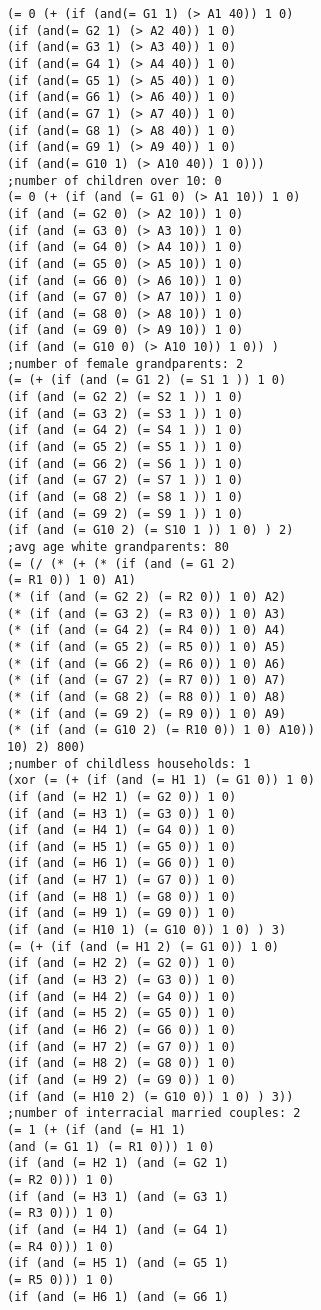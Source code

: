 \documentclass[5p,times,11pt]{elsarticle}
\begin{document}
\begin{verbatim}
(= 0 (+ (if (and(= G1 1) (> A1 40)) 1 0)
(if (and(= G2 1) (> A2 40)) 1 0)
(if (and(= G3 1) (> A3 40)) 1 0)
(if (and(= G4 1) (> A4 40)) 1 0)
(if (and(= G5 1) (> A5 40)) 1 0)
(if (and(= G6 1) (> A6 40)) 1 0)
(if (and(= G7 1) (> A7 40)) 1 0)
(if (and(= G8 1) (> A8 40)) 1 0)
(if (and(= G9 1) (> A9 40)) 1 0)
(if (and(= G10 1) (> A10 40)) 1 0)))
;number of children over 10: 0
(= 0 (+ (if (and (= G1 0) (> A1 10)) 1 0)
(if (and (= G2 0) (> A2 10)) 1 0)
(if (and (= G3 0) (> A3 10)) 1 0)
(if (and (= G4 0) (> A4 10)) 1 0)
(if (and (= G5 0) (> A5 10)) 1 0)
(if (and (= G6 0) (> A6 10)) 1 0)
(if (and (= G7 0) (> A7 10)) 1 0)
(if (and (= G8 0) (> A8 10)) 1 0)
(if (and (= G9 0) (> A9 10)) 1 0)
(if (and (= G10 0) (> A10 10)) 1 0)) )
;number of female grandparents: 2
(= (+ (if (and (= G1 2) (= S1 1 )) 1 0)
(if (and (= G2 2) (= S2 1 )) 1 0)
(if (and (= G3 2) (= S3 1 )) 1 0)
(if (and (= G4 2) (= S4 1 )) 1 0)
(if (and (= G5 2) (= S5 1 )) 1 0)
(if (and (= G6 2) (= S6 1 )) 1 0)
(if (and (= G7 2) (= S7 1 )) 1 0)
(if (and (= G8 2) (= S8 1 )) 1 0)
(if (and (= G9 2) (= S9 1 )) 1 0)
(if (and (= G10 2) (= S10 1 )) 1 0) ) 2)
;avg age white grandparents: 80
(= (/ (* (+ (* (if (and (= G1 2)
(= R1 0)) 1 0) A1)
(* (if (and (= G2 2) (= R2 0)) 1 0) A2)
(* (if (and (= G3 2) (= R3 0)) 1 0) A3)
(* (if (and (= G4 2) (= R4 0)) 1 0) A4)
(* (if (and (= G5 2) (= R5 0)) 1 0) A5)
(* (if (and (= G6 2) (= R6 0)) 1 0) A6)
(* (if (and (= G7 2) (= R7 0)) 1 0) A7)
(* (if (and (= G8 2) (= R8 0)) 1 0) A8)
(* (if (and (= G9 2) (= R9 0)) 1 0) A9)
(* (if (and (= G10 2) (= R10 0)) 1 0) A10))
10) 2) 800)
;number of childless households: 1
(xor (= (+ (if (and (= H1 1) (= G1 0)) 1 0)
(if (and (= H2 1) (= G2 0)) 1 0)
(if (and (= H3 1) (= G3 0)) 1 0)
(if (and (= H4 1) (= G4 0)) 1 0)
(if (and (= H5 1) (= G5 0)) 1 0)
(if (and (= H6 1) (= G6 0)) 1 0)
(if (and (= H7 1) (= G7 0)) 1 0)
(if (and (= H8 1) (= G8 0)) 1 0)
(if (and (= H9 1) (= G9 0)) 1 0)
(if (and (= H10 1) (= G10 0)) 1 0) ) 3)
(= (+ (if (and (= H1 2) (= G1 0)) 1 0)
(if (and (= H2 2) (= G2 0)) 1 0)
(if (and (= H3 2) (= G3 0)) 1 0)
(if (and (= H4 2) (= G4 0)) 1 0)
(if (and (= H5 2) (= G5 0)) 1 0)
(if (and (= H6 2) (= G6 0)) 1 0)
(if (and (= H7 2) (= G7 0)) 1 0)
(if (and (= H8 2) (= G8 0)) 1 0)
(if (and (= H9 2) (= G9 0)) 1 0)
(if (and (= H10 2) (= G10 0)) 1 0) ) 3))
;number of interracial married couples: 2
(= 1 (+ (if (and (= H1 1)
(and (= G1 1) (= R1 0))) 1 0)
(if (and (= H2 1) (and (= G2 1)
(= R2 0))) 1 0)
(if (and (= H3 1) (and (= G3 1)
(= R3 0))) 1 0)
(if (and (= H4 1) (and (= G4 1)
(= R4 0))) 1 0)
(if (and (= H5 1) (and (= G5 1)
(= R5 0))) 1 0)
(if (and (= H6 1) (and (= G6 1)

\end{verbatim}
\end{document}
